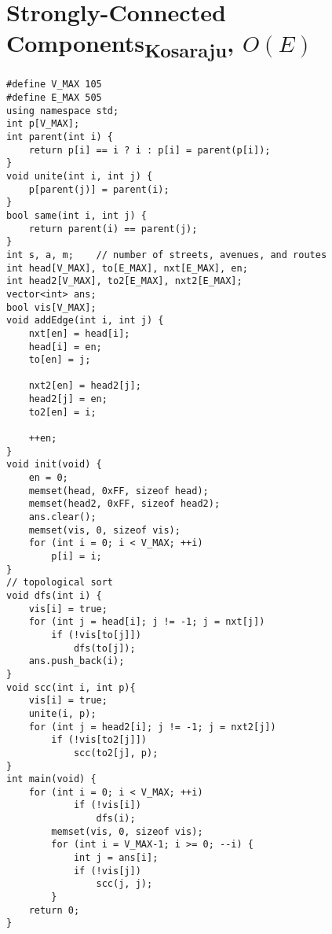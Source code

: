\documentclass[12pt]{book}
\begin{document}
\section{Strongly-Connected Components\textsubscript{Kosaraju}, $O(E)$}
\begin{verbatim}
#define V_MAX 105
#define E_MAX 505
using namespace std;
int p[V_MAX];
int parent(int i) {
	return p[i] == i ? i : p[i] = parent(p[i]);
}
void unite(int i, int j) {
	p[parent(j)] = parent(i);
}
bool same(int i, int j) {
	return parent(i) == parent(j);
}
int s, a, m;	// number of streets, avenues, and routes
int head[V_MAX], to[E_MAX], nxt[E_MAX], en;
int head2[V_MAX], to2[E_MAX], nxt2[E_MAX];
vector<int> ans;
bool vis[V_MAX];
void addEdge(int i, int j) {
	nxt[en] = head[i];
	head[i] = en;
	to[en] = j;

	nxt2[en] = head2[j];
	head2[j] = en;
	to2[en] = i;

	++en;
}
void init(void) {
	en = 0;
	memset(head, 0xFF, sizeof head);
	memset(head2, 0xFF, sizeof head2);
	ans.clear();
	memset(vis, 0, sizeof vis);
	for (int i = 0; i < V_MAX; ++i)
		p[i] = i;
}
// topological sort
void dfs(int i) {
	vis[i] = true;
	for (int j = head[i]; j != -1; j = nxt[j])
		if (!vis[to[j]])
			dfs(to[j]);
	ans.push_back(i);
}
void scc(int i, int p){
	vis[i] = true;
	unite(i, p);
	for (int j = head2[i]; j != -1; j = nxt2[j])
		if (!vis[to2[j]])
			scc(to2[j], p);
}
int main(void) {
	for (int i = 0; i < V_MAX; ++i)
			if (!vis[i])
				dfs(i);
		memset(vis, 0, sizeof vis);
		for (int i = V_MAX-1; i >= 0; --i) {
			int j = ans[i];
			if (!vis[j])
				scc(j, j);
		}
	return 0;
}
\end{verbatim}
\end{document}
